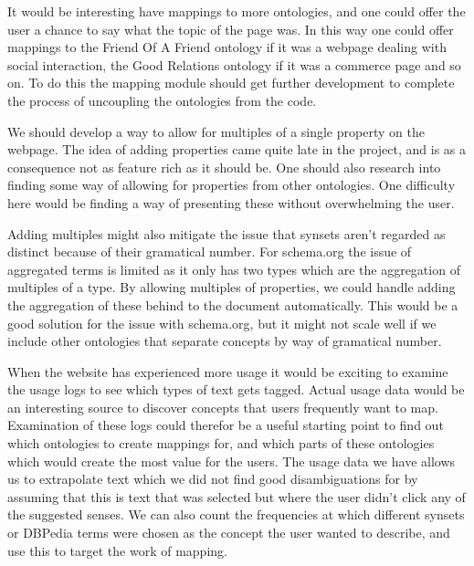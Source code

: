 It would be interesting have mappings to more ontologies,
and one could offer the user a chance to say what the topic of the page was.
In this way one could offer mappings to the Friend Of A Friend ontology if it was a webpage dealing with
social interaction, the Good Relations ontology if it was a commerce page and so on.
To do this the mapping module should get further development to complete the process of uncoupling the ontologies
from the code.

We should develop a way to allow for multiples of a single property on the webpage.
The idea of adding properties came quite late in the project,
and is as a consequence not as feature rich as it should be.
One should also research into finding some way of allowing for properties from other ontologies.
One difficulty here would be finding a way of presenting these without overwhelming the user.

Adding multiples might also mitigate the issue that synsets aren't regarded as distinct because of their gramatical number.
For schema.org the issue of aggregated terms is limited as it only has two types which are the aggregation of multiples of a type.
By allowing multiples of properties, we could handle adding the aggregation of these behind to the document automatically.
This would be a good solution for the issue with schema.org, but it might not scale well if we include other ontologies
that separate concepts by way of gramatical number.

When the website has experienced more usage it would be exciting to examine the usage logs to see which types of text gets tagged.
Actual usage data would be an interesting source to discover concepts that users frequently want to map.
Examination of these logs could therefor be a useful starting point to find out which ontologies to create mappings for,
and which parts of these ontologies which would create the most value for the users.
The usage data we have allows us to extrapolate text which we did not find good disambiguations for
by assuming that this is text that was selected but where the user didn't click any of the suggested senses.
We can also count the frequencies at which different synsets or DBPedia terms were chosen as the concept the
user wanted to describe, and use this to target the work of mapping.


